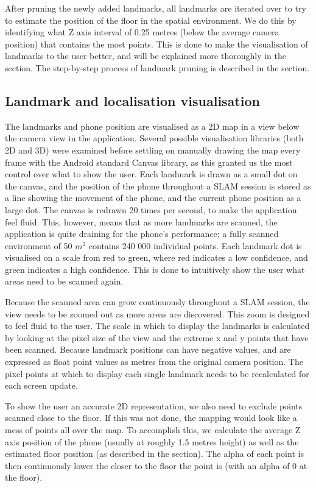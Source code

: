 \documentclass{article}
\begin{document}
After pruning the newly added landmarks, all landmarks are iterated over to try to estimate the position of the floor in the spatial environment. We do this by identifying what Z axis interval of 0.25 metres (below the average camera position) that contains the most points. This is done to make the visualisation of landmarks to the user better, and will be explained more thoroughly in the  section. The step-by-step process of landmark pruning is described in the  section.

\subsection{Landmark and localisation visualisation} \label{landmark-visualisation}
The landmarks and phone position are visualised as a 2D map in a view below the camera view in the application. Several possible visualisation libraries (both 2D and 3D) were examined before settling on manually drawing the map every frame with the Android standard Canvas library, as this granted us the most control over what to show the user. Each landmark is drawn as a small dot on the canvas, and the position of the phone throughout a SLAM session is stored as a line showing the movement of the phone, and the current phone position as a large dot. The canvas is redrawn 20 times per second, to make the application feel fluid. This, however, means that as more landmarks are scanned, the application is quite draining for the phone's performance; a fully scanned environment of 50 $m^2$ contains 240 000 individual points. Each landmark dot is visualised on a scale from red to green, where red indicates a low confidence, and green indicates a high confidence. This is done to intuitively show the user what areas need to be scanned again.

Because the scanned area can grow continuously throughout a SLAM session, the view needs to be zoomed out as more areas are discovered. This zoom is designed to feel fluid to the user. The scale in which to display the landmarks is calculated by looking at the pixel size of the view and the extreme x and y points that have been scanned. Because landmark positions can have negative values, and are expressed as float point values as metres from the original camera position. The pixel points at which to display each single landmark needs to be recalculated for each screen update.

To show the user an accurate 2D representation, we also need to exclude points scanned close to the floor. If this was not done, the mapping would look like a mess of points all over the map. To accomplish this, we calculate the average Z axis position of the phone (usually at roughly 1.5 metres height) as well as the estimated floor position (as described in the  section). The alpha of each point is then continuously lower the closer to the floor the point is (with an alpha of 0 at the floor).
\end{document}
